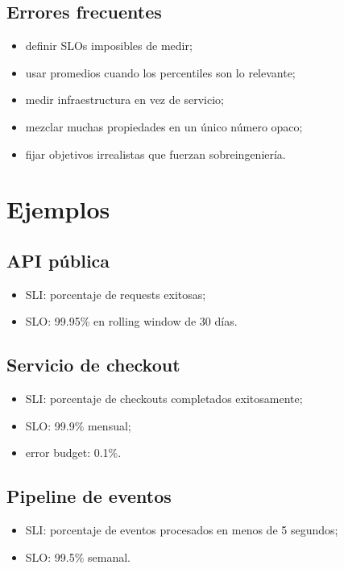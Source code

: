 \documentclass[variant=apuntes,cover=institutional,mode=screen]{ua-engineering-v6-article}
\begin{document}
\subsection{Errores frecuentes}

\begin{itemize}
\item definir SLOs imposibles de medir;
\item usar promedios cuando los percentiles son lo relevante;
\item medir infraestructura en vez de servicio;
\item mezclar muchas propiedades en un único número opaco;
\item fijar objetivos irrealistas que fuerzan sobreingeniería.
\end{itemize}

\section{Ejemplos}

\subsection{API pública}
\begin{itemize}
\item SLI: porcentaje de requests exitosas;
\item SLO: 99.95\% en rolling window de 30 días.
\end{itemize}

\subsection{Servicio de checkout}
\begin{itemize}
\item SLI: porcentaje de checkouts completados exitosamente;
\item SLO: 99.9\% mensual;
\item error budget: 0.1\%.
\end{itemize}

\subsection{Pipeline de eventos}
\begin{itemize}
\item SLI: porcentaje de eventos procesados en menos de 5 segundos;
\item SLO: 99.5\% semanal.
\end{itemize}
\end{document}
